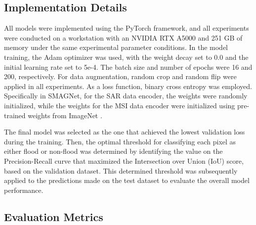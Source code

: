 \documentclass[preprint,12pt,authoryear]{elsarticle}
\begin{document}
\subsection{Implementation Details}
\label{Section4.2}

All models were implemented using the PyTorch framework, and all experiments were conducted on a workstation with an NVIDIA RTX A5000 and 251 GB of memory under the same experimental parameter conditions. In the model training, the Adam \citep{kingma2014adam} optimizer was used, with the weight decay set to 0.0 and the initial learning rate set to 5e-4. The batch size and number of epochs were 16 and 200, respectively. For data augmentation, random crop and random flip were applied in all experiments. As a loss function, binary cross entropy was employed. Specifically in SMAGNet, for the SAR data encoder, the weights were randomly initialized, while the weights for the MSI data encoder were initialized using pre-trained weights from ImageNet \citep{deng2009imagenet}.

The final model was selected as the one that achieved the lowest validation loss during the training. Then, the optimal threshold for classifying each pixel as either flood or non-flood was determined by identifying the value on the Precision-Recall curve that maximized the Intersection over Union (IoU) score, based on the validation dataset. This determined threshold was subsequently applied to the predictions made on the test dataset to evaluate the overall model performance.

\subsection{Evaluation Metrics}
\label{Section4.3}
\end{document}
